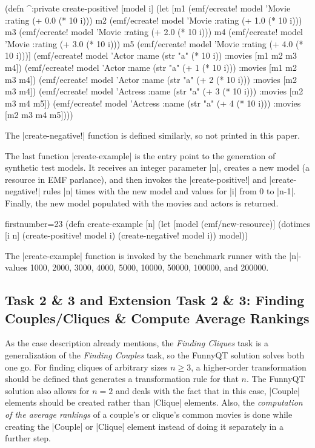 \documentclass[submission]{eptcs}
\newcommand{\code}{\clojureinline}
\begin{document}
\begin{clojurecode}
(defn ^:private create-positive! [model i]
  (let [m1 (emf/ecreate! model 'Movie :rating (+ 0.0 (* 10 i)))
        m2 (emf/ecreate! model 'Movie :rating (+ 1.0 (* 10 i)))
        m3 (emf/ecreate! model 'Movie :rating (+ 2.0 (* 10 i)))
        m4 (emf/ecreate! model 'Movie :rating (+ 3.0 (* 10 i)))
        m5 (emf/ecreate! model 'Movie :rating (+ 4.0 (* 10 i)))]
    (emf/ecreate! model 'Actor   :name (str "a" (* 10 i))       :movies [m1 m2 m3 m4])
    (emf/ecreate! model 'Actor   :name (str "a" (+ 1 (* 10 i))) :movies [m1 m2 m3 m4])
    (emf/ecreate! model 'Actor   :name (str "a" (+ 2 (* 10 i))) :movies [m2 m3 m4])
    (emf/ecreate! model 'Actress :name (str "a" (+ 3 (* 10 i))) :movies [m2 m3 m4 m5])
    (emf/ecreate! model 'Actress :name (str "a" (+ 4 (* 10 i))) :movies [m2 m3 m4 m5])))
\end{clojurecode}

The \code|create-negative!| function is defined similarly, so not printed in
this paper.

The last function \code|create-example| is the entry point to the generation of
synthetic test models.  It receives an integer parameter \code|n|, creates a
new model (a resource in EMF parlance), and then invokes the
\code|create-positive!| and \code|create-negative!| rules \code|n| times with
the new model and values for \code|i| from 0 to \code|n-1|.  Finally, the new
model populated with the movies and actors is returned.

\begin{clojurecode*}{firstnumber=23}
(defn create-example [n]
  (let [model (emf/new-resource)]
    (dotimes [i n]
      (create-positive! model i)
      (create-negative! model i))
    model))
\end{clojurecode*}

The \code|create-example| function is invoked by the benchmark runner with the
\code|n|-values 1000, 2000, 3000, 4000, 5000, 10000, 50000, 100000, and 200000.


\subsection{Task 2 \& 3 and Extension Task 2 \& 3: Finding Couples/Cliques \&
  Compute Average Rankings}
\label{sec:task-2:finding-groups}

As the case description already mentions, the \emph{Finding Cliques} task is a
generalization of the \emph{Finding Couples} task, so the FunnyQT solution
solves both one go.  For finding cliques of arbitrary sizes \(n \geq 3\),
a higher-order transformation should be defined that generates a transformation
rule for that \(n\).
The FunnyQT solution also allows for \(n = 2\)
and deals with the fact that in this case, \code|Couple| elements should be
created rather than \code|Clique| elements.  Also, the \emph{computation of the
  average rankings} of a couple's or clique's common movies is done while
creating the \code|Couple| or \code|Clique| element instead of doing it
separately in a further step.
\end{document}
